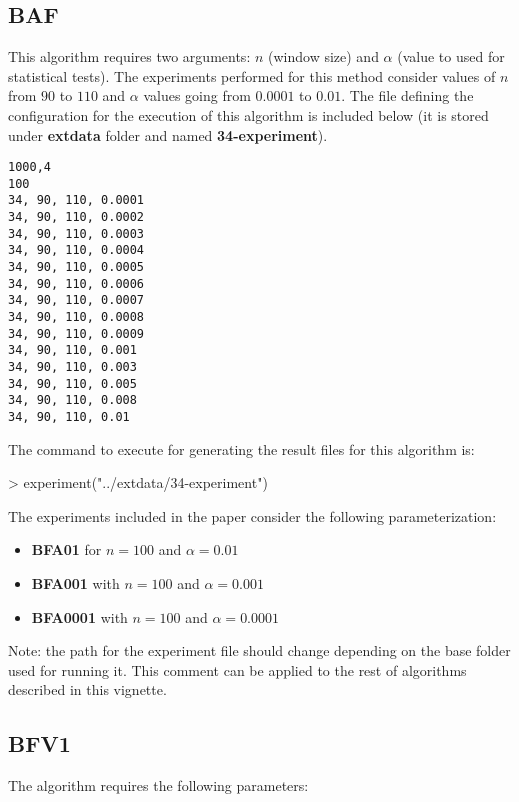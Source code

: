 \documentclass{article}
\begin{document}
\subsection{BAF}

This algorithm requires two arguments: $n$ (window size) and $\alpha$ (value to used
for statistical tests). The experiments performed for this method consider values of
$n$ from $90$ to $110$ and $\alpha$ values going from $0.0001$ to $0.01$. The file
defining the configuration for the execution of this algorithm is included below
(it is stored under \textbf{extdata} folder and named \textbf{34-experiment}).

\begin{verbatim}
1000,4
100
34, 90, 110, 0.0001
34, 90, 110, 0.0002
34, 90, 110, 0.0003
34, 90, 110, 0.0004
34, 90, 110, 0.0005
34, 90, 110, 0.0006
34, 90, 110, 0.0007
34, 90, 110, 0.0008
34, 90, 110, 0.0009
34, 90, 110, 0.001
34, 90, 110, 0.003
34, 90, 110, 0.005
34, 90, 110, 0.008
34, 90, 110, 0.01
\end{verbatim}

The command to execute for generating the result files for this algorithm is:

\begin{Schunk}
\begin{Sinput}
> experiment("../extdata/34-experiment")
\end{Sinput}
\end{Schunk}

The experiments included in the paper consider the following parameterization:

\begin{itemize}
\item \textbf{BFA01} for $n=100$ and $\alpha=0.01$
\item \textbf{BFA001} with $n=100$ and $\alpha=0.001$
\item \textbf{BFA0001} with $n=100$ and $\alpha=0.0001$
\end{itemize}

Note: the path for the experiment file should change depending on the base folder
used for running it. This comment can be applied to the rest of algorithms described
in this vignette.

\subsection{BFV1}

The algorithm requires the following parameters:
\end{document}
